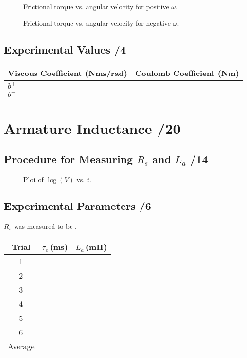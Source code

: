 \documentclass{article}
\newcommand{\score}{\hfill \underline{\hspace{1cm}}/}
\begin{document}
\begin{figure}[hptb]
\centering
\caption{Frictional torque vs. angular velocity for positive $\omega$.}
\label{fig:fp1}
\end{figure}

\begin{figure}[hptb]
\centering
\caption{Frictional torque vs. angular velocity for negative $\omega$.}
\label{fig:fp2}
\end{figure}

\subsection{Experimental Values \score 4}
\begin{center}
\begin{tabular}{lr|lr}
\multicolumn{2}{c}{Viscous Coefficient (Nms/rad)} & \multicolumn{2}{c}{Coulomb Coefficient (Nm)} \\
\hline
$b^+$ &   &   &   \\
$b^-$ &   &   &  
\end{tabular}
\end{center}

\section{Armature Inductance \score 20}
\subsection{Procedure for Measuring $R_s$ and $L_a$ \score 14}


\begin{figure}[htbp]
\centering
\caption{Plot of $\log(V)$ vs. $t$. }
\label{fig:La_plot}
\end{figure}


\subsection{Experimental Parameters \score 6}
$R_s$ was measured to be   .
\begin{center}
\begin{tabular}{crr}
Trial & $\tau_e$\,(ms) & $L_a$\,(mH) \\
\hline
1 &  &  \\
2 &  &  \\
3 &  &  \\
4 &  &  \\
5 &  &  \\
6 &  &  \\
Average &  & 
\end{tabular}
\end{center}
\end{document}
